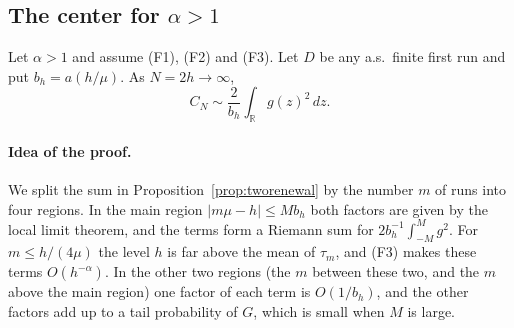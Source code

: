 \subsection{The center for \texorpdfstring{$\alpha>1$}{alpha > 1}}\label{app:heavy-center}

\begin{proposition}\label{prop:C-center}
Let $\alpha>1$ and assume \textup{(F1)}, \textup{(F2)} and \textup{(F3)}. Let $D$ be any
a.s.\ finite first run and put $b_h=a(h/\mu)$. As $N=2h\to\infty$,
\[
C_N\sim\frac2{b_h}\int_{\mathbb R}g(z)^2\,dz .
\]
\end{proposition}

\paragraph{Idea of the proof.}
We split the sum in Proposition~\ref{prop:tworenewal} by the number $m$ of runs into four
regions. In the main region $\lvert m\mu-h\rvert\le Mb_h$ both factors are given by the
local limit theorem, and the terms form a Riemann sum for $2b_h^{-1}\int_{-M}^Mg^2$. For
$m\le h/(4\mu)$ the level $h$ is far above the mean of $\tau_m$, and (F3) makes these terms
$O(h^{-\alpha})$. In the other two regions (the $m$ between these two, and the $m$ above
the main region) one factor of each term is $O(1/b_h)$, and the other factors add up to a
tail probability of $G$, which is small when $M$ is large.

